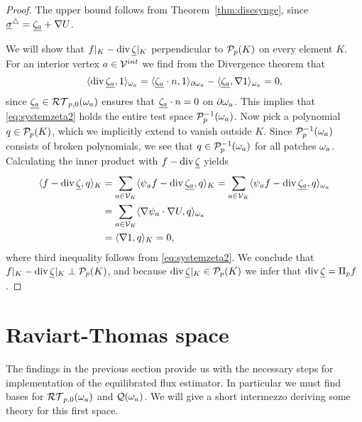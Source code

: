 \documentclass[thesis.tex]{subfiles}
\begin{document}
\begin{proof}
  The upper bound follows from Theorem~\ref{thm:discsynge}, since  $\vsig^\triangle = \vzeta + \nabla U$.

  We will show that $f|_K - \div \vzet|_K$  perpendicular to $\P_p(K)$ on every element $K$.
  For an interior vertex $a \in \V^{int}$ we find from the Divergence theorem that 
  \[
    \ip{\div \vzeta, 1}_{\w_a} =  \ip{\vzeta \cdot n, 1}_{\partial \w_a} - \ip{\vzeta, \nabla 1}_{\w_a} = 0,
  \]
  since $\vzeta \in \RT_{p,0}(\w_a)$ ensures that $\vzeta \cdot n = 0$ on $\partial \w_a$.
  This implies that \eqref{eq:systemzeta2} holds the entire test space $\P_p^{-1}(\w_a)$. Now pick a polynomial $q \in \P_p(K)$,
  which we implicitly extend to vanish outside $K$.  Since $\P_p^{-1}(\w_a)$ consists of broken polynomials, we see that $q \in \P_p^{-1}(\w_a)$
  for all patches $\w_a$. Calculating the inner product with $f - \div \vzet$ yields
  \begin{align*}
    \ip{f - \div \vzet, q}_K &= \sum_{a \in \V_K} \ip{ \psi_a f - \div \vzeta, q}_{K} = \sum_{a \in \V_K} \ip {\psi_a f - \div \vzeta, q}_{\w_a}\\
     &=\sum_{a \in \V_K} \ip{\nabla \psi_a \cdot \nabla U, q}_{\w_a}\\
    &= \ip{\nabla 1, q}_{K} = 0,
  \end{align*}
  where third inequality follows from \eqref{eq:systemzeta2}. We conclude that  $f|_K - \div \vzet|_K \perp \P_p(K)$, and because $\div \vzet|_K \in \P_p(K)$
  we infer that $\div \vzet= \Pi_p f$.
\end{proof}


\section{Raviart-Thomas space}
The findings in the previous section provide us with the necessary steps for implementation of the equilibrated flux
estimator. In particular we must find bases for $\RT_{p,0}(\w_a)$ and $\QQ(\w_a)$. We will give a short
intermezzo deriving some theory for this first space. 
\end{document}
